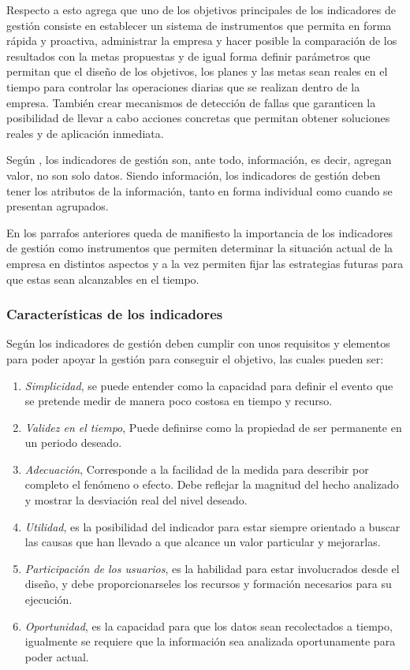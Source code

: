 Respecto a esto \cite{silva} agrega que uno de los objetivos principales de los
indicadores de gesti\'on consiste en establecer un sistema de instrumentos que
permita en forma r\'apida y proactiva, administrar la empresa y hacer posible la
comparaci\'on de los resultados con la metas propuestas y de igual forma definir
par\'ametros que permitan que el dise\~no de los objetivos, los planes y las metas sean
reales en el tiempo para controlar las operaciones diarias que se realizan dentro
de la empresa. Tambi\'en crear mecanismos de detecci\'on de fallas que garanticen
la posibilidad de llevar a cabo acciones concretas que permitan obtener soluciones
reales y de aplicaci\'on inmediata.

Seg\'un \cite{beltran}, los indicadores de gesti\'on son, ante todo, informaci\'on, es
decir, agregan valor, no son solo datos. Siendo informaci\'on, los indicadores de
gesti\'on deben tener los atributos de la informaci\'on, tanto en forma individual
como cuando se presentan agrupados.

En los parrafos anteriores queda de manifiesto la importancia de los indicadores
de gesti\'on como instrumentos que permiten determinar la situaci\'on actual de la
empresa en distintos aspectos y a la vez permiten fijar las estrategias futuras
para que estas sean alcanzables en el tiempo.

\subsubsection{Caracter\'isticas de los indicadores}
Seg\'un \cite{silva} los indicadores de gesti\'on deben cumplir con unos requisitos
y elementos para poder apoyar la gesti\'on para conseguir el objetivo, las cuales
pueden ser:
\begin{enumerate}
    \item \emph{Simplicidad}, se puede entender como la capacidad para definir el
          evento que se pretende medir de manera poco costosa en tiempo y recurso.
    \item \emph{Validez en el tiempo}, Puede definirse como la propiedad de ser
          permanente en un periodo deseado.
    \item \emph{Adecuaci\'on}, Corresponde a la facilidad de la medida para describir
          por completo el fen\'omeno o efecto. Debe reflejar la magnitud del hecho
          analizado y mostrar la desviaci\'on real del nivel deseado.
    \item \emph{Utilidad}, es la posibilidad del indicador para estar siempre
          orientado a buscar las causas que han llevado a que alcance un valor
          particular y mejorarlas.
    \item \emph{Participaci\'on de los usuarios}, es la habilidad para estar involucrados
          desde el dise\~no, y debe proporcionarseles los recursos y formaci\'on necesarios
          para su ejecuci\'on.
    \item \emph{Oportunidad}, es la capacidad para que los datos sean recolectados
          a tiempo, igualmente se requiere que la informaci\'on sea analizada oportunamente
          para poder actual.
\end{enumerate}

